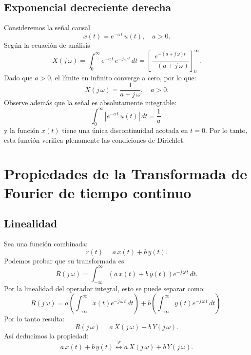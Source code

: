 \documentclass[11pt,a4paper,openany]{book}
\begin{document}
\subsection{Exponencial decreciente derecha}

Consideremos la señal causal
\begin{equation}
	x(t) = e^{-a \, t} \, u(t), \quad a > 0.
\end{equation}
Según la ecuación de análisis 
\begin{equation}
	X(j \, \omega) = \int_{0}^{\infty} e^{-a \, t} \, e^{-j \, \omega \, t} \, dt = \left[ \frac{e^{-(a + j \, \omega) t}}{-(a + j \, \omega)} \right]_{0}^{\infty}.
\end{equation}
Dado que $a>0$, el límite en infinito converge a cero, por lo que:
\begin{equation}
	X(j \, \omega) = \frac{1}{a + j \, \omega}, \quad a > 0.
\end{equation}
Observe además que la señal es absolutamente integrable:
\begin{equation}
	\int_{0}^{\infty} | e^{-a \, t} \, u(t) | \, dt = \frac{1}{a}.
\end{equation}
y la función $x(t)$ tiene una única discontinuidad acotada en $t = 0$. Por lo tanto, esta función verifica plenamente las condiciones de Dirichlet.

\section{Propiedades de la Transformada de Fourier de tiempo continuo}

\subsection{Linealidad}

Sea una función combinada:
\begin{equation}
	r(t) = a \, x(t) + b \, y(t).
\end{equation}
Podemos probar que su transformada es:
\begin{equation}
	R(j \, \omega) = \int_{-\infty}^{\infty} (a \, x(t) + b \, y(t)) e^{-j \, \omega \, t} \, dt.
\end{equation}
Por la linealidad del operador integral, esto se puede separar como:
\begin{equation}
	R(j \, \omega) = a \left( \int_{-\infty}^{\infty} x(t) e^{-j \, \omega \, t} \, dt \right) + b \left( \int_{-\infty}^{\infty} y(t) e^{-j \, \omega \, t} \, dt \right).
\end{equation}
Por lo tanto resulta:
\begin{equation}
	R(j \, \omega) = a \, X(j \, \omega) + b \, Y(j \, \omega).
\end{equation}
Así deducimos la propiedad:
\begin{equation}
	a \, x(t) + b \, y(t) \stackrel{\mathcal{F}}{\longleftrightarrow} a \, X(j \, \omega) + b \, Y(j \, \omega) .
\end{equation}
\end{document}
